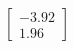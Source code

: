 \documentclass[preview]{standalone}
\begin{document}
\begin{align*}
\begin{bmatrix} -3.92 \\ 1.96 \end{bmatrix}
\end{align*}
\end{document}
